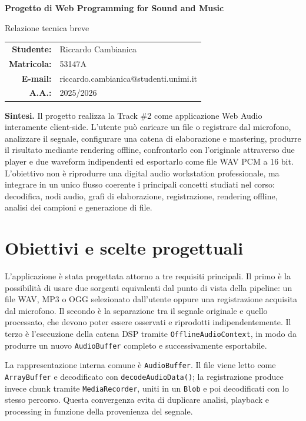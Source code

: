 \documentclass[11pt,a4paper]{article}
\begin{document}
	
	\begin{center}
		{\LARGE\bfseries\color{accent} Progetto di Web Programming for Sound and Music}\par
		\vspace{0.2em}
		{\large Relazione tecnica breve}\par
		\vspace{0.55em}
		\begin{tabular}{rl}
			\textbf{Studente:} & Riccardo Cambianica \\
			\textbf{Matricola:} & 53147A \\
			\textbf{E-mail:} & riccardo.cambianica@studenti.unimi.it \\
			\textbf{A.A.:} & 2025/2026
		\end{tabular}
	\end{center}
	
	\vspace{0.45em}
	\textbf{Sintesi.}
	Il progetto realizza la Track \#2 come applicazione Web Audio interamente client-side. L'utente può caricare un file o registrare dal microfono, analizzare il segnale, configurare una catena di elaborazione e mastering, produrre il risultato mediante rendering offline, confrontarlo con l'originale attraverso due player e due waveform indipendenti ed esportarlo come file WAV PCM a 16 bit. L'obiettivo non è riprodurre una digital audio workstation professionale, ma integrare in un unico flusso coerente i principali concetti studiati nel corso: decodifica, nodi audio, grafi di elaborazione, registrazione, rendering offline, analisi dei campioni e generazione di file.
	
	\section{Obiettivi e scelte progettuali}
	
	L'applicazione è stata progettata attorno a tre requisiti principali. Il primo è la possibilità di usare due sorgenti equivalenti dal punto di vista della pipeline: un file WAV, MP3 o OGG selezionato dall'utente oppure una registrazione acquisita dal microfono. Il secondo è la separazione tra il segnale originale e quello processato, che devono poter essere osservati e riprodotti indipendentemente. Il terzo è l'esecuzione della catena DSP tramite \texttt{OfflineAudioContext}, in modo da produrre un nuovo \texttt{AudioBuffer} completo e successivamente esportabile.
	
	La rappresentazione interna comune è \texttt{AudioBuffer}. Il file viene letto come \texttt{ArrayBuffer} e decodificato con \texttt{decodeAudioData()}; la registrazione produce invece chunk tramite \texttt{MediaRecorder}, uniti in un \texttt{Blob} e poi decodificati con lo stesso percorso. Questa convergenza evita di duplicare analisi, playback e processing in funzione della provenienza del segnale.
	
\end{document}
